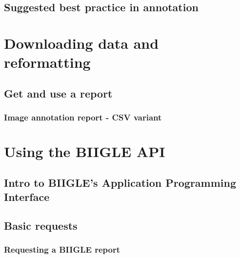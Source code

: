 \documentclass[
  letterpaper,
  DIV=11,
  numbers=noendperiod]{scrartcl}
\begin{document}
\hypertarget{suggested-best-practice-in-annotation}{%
\subsection{Suggested best practice in
annotation}\label{suggested-best-practice-in-annotation}}

\hypertarget{downloading-data-and-reformatting}{%
\section{Downloading data and
reformatting}\label{downloading-data-and-reformatting}}

\hypertarget{get-and-use-a-report}{%
\subsection{Get and use a report}\label{get-and-use-a-report}}

\hypertarget{image-annotation-report---csv-variant}{%
\subsubsection{Image annotation report - CSV
variant}\label{image-annotation-report---csv-variant}}

\hypertarget{using-the-biigle-api}{%
\section{Using the BIIGLE API}\label{using-the-biigle-api}}

\hypertarget{intro-to-biigles-application-programming-interface}{%
\subsection{Intro to BIIGLE's Application Programming
Interface}\label{intro-to-biigles-application-programming-interface}}

\hypertarget{basic-requests}{%
\subsection{Basic requests}\label{basic-requests}}

\hypertarget{requesting-a-biigle-report}{%
\subsubsection{Requesting a BIIGLE
report}\label{requesting-a-biigle-report}}
\end{document}
